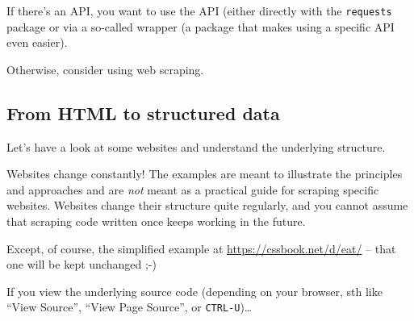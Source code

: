 \begin{frame}[standout]
  If there's an API, you want to use the API (either directly with the \texttt{requests} package or via a so-called wrapper (a package that makes using a specific API even easier).

  Otherwise, consider using web scraping.

\end{frame}

\subsection{From HTML to structured data}


\begin{frame}
Let's have a look at some websites and understand the underlying structure.
\vspace{1cm}
\pause
\begin{alertblock}{Websites change constantly!}
The examples are meant to illustrate the principles and approaches and are \emph{not} meant as a practical guide for scraping specific websites. Websites change their structure quite regularly, and you cannot assume that scraping code written once keeps working in the future.
\end{alertblock}
\footnotesize{Except, of course, the simplified example at \url{https://cssbook.net/d/eat/} -- that one will be kept unchanged ;-)}
\end{frame}




{
\begin{frame}[plain]
\end{frame}
}

\begin{frame}[plain]
If you view the underlying source code (depending on your browser, sth like ``View Source'', ``View Page Source'', or \texttt{CTRL-U})\ldots

\end{frame}
{
\begin{frame}[plain]
\end{frame}
}


